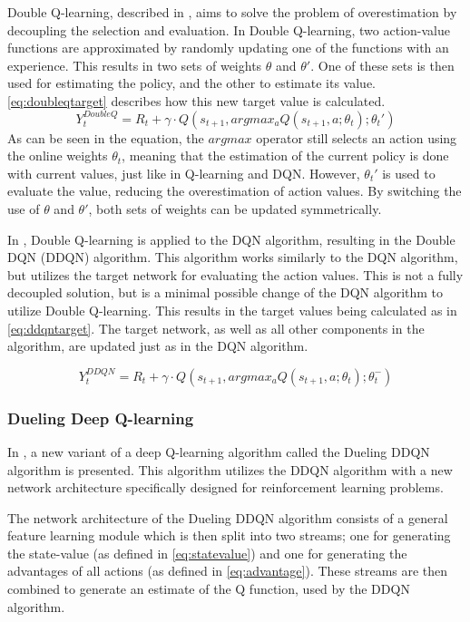 \documentclass{kththesis}
\begin{document}
Double Q-learning, described in \parencite{hasselt2010double}, aims to solve the problem of overestimation by decoupling the selection and evaluation. In Double Q-learning, two action-value functions are approximated by randomly updating one of the functions with an experience. This results in two sets of weights $\theta$ and $\theta'$. One of these sets is then used for estimating the policy, and the other to estimate its value. \autoref{eq:doubleqtarget} describes how this new target value is calculated.
\begin{equation}
\label{eq:doubleqtarget}
Y_t^{DoubleQ} = R_t + \gamma \cdot Q(s_{t+1}, argmax_aQ(s_{t+1}, a;\theta_t);\theta_t')
\end{equation}
As can be seen in the equation, the $argmax$ operator still selects an action using the online weights $\theta_t$, meaning that the estimation of the current policy is done with current values, just like in Q-learning and DQN. However, $\theta_t'$ is used to evaluate the value, reducing the overestimation of action values. By switching the use of $\theta$ and $\theta'$, both sets of weights can be updated symmetrically. \parencite{van2016deep}

In \parencite{van2016deep}, Double Q-learning is applied to the DQN algorithm, resulting in the Double DQN (DDQN) algorithm. This algorithm works similarly to the DQN algorithm, but utilizes the target network for evaluating the action values. This is not a fully decoupled solution, but is a minimal possible change of the DQN algorithm to utilize Double Q-learning. This results in the target values being calculated as in \autoref{eq:ddqntarget}. The target network, as well as all other components in the algorithm, are updated just as in the DQN algorithm.

\begin{equation}
\label{eq:ddqntarget}
Y_t^{DDQN} = R_t + \gamma \cdot Q(s_{t+1}, argmax_aQ(s_{t+1}, a;\theta_t);\theta_t^-)
\end{equation}

\subsubsection{Dueling Deep Q-learning}
In \parencite{wang2015dueling}, a new variant of a deep Q-learning algorithm called the Dueling DDQN algorithm is presented. This algorithm utilizes the DDQN algorithm with a new network architecture specifically designed for reinforcement learning problems. 

The network architecture of the Dueling DDQN algorithm consists of a general feature learning module which is then split into two streams; one for generating the state-value (as defined in \autoref{eq:statevalue}) and one for generating the advantages of all actions (as defined in \autoref{eq:advantage}). These streams are then combined to generate an estimate of the Q function, used by the DDQN algorithm.
\end{document}
